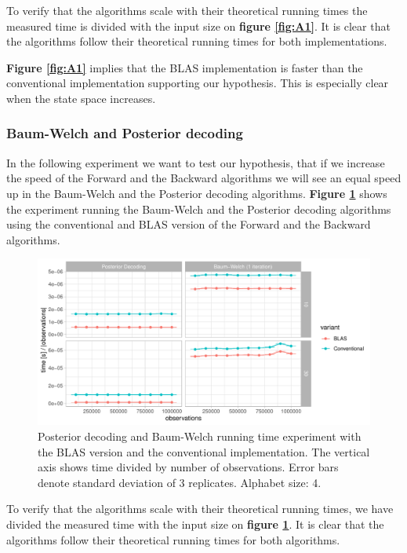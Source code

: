 To verify that the algorithms scale with their theoretical running times the measured time is divided with the input size on \textbf{figure \ref{fig:A1}}. It is clear that the algorithms follow their theoretical running times for both implementations.

\textbf{Figure \ref{fig:A1}} implies that the BLAS implementation is faster than the conventional implementation supporting our hypothesis. This is especially clear when the state space increases.

\subsubsection{Baum-Welch and Posterior decoding}\label{sec:A2}

In the following experiment we want to test our hypothesis, that if we increase the speed of the Forward and the Backward algorithms we will see an equal speed up in the Baum-Welch and the Posterior decoding algorithms. \textbf{Figure \ref{fig:A2}} shows the experiment running the Baum-Welch and the Posterior decoding algorithms using the conventional and BLAS version of the Forward and the Backward algorithms.

\begin{figure}[H]
  \centering
  \includegraphics[scale=0.85]{figures/figure_A2.pdf}
  \caption{\small{Posterior decoding and Baum-Welch running time experiment with the BLAS version and the conventional implementation. The vertical axis shows time divided by number of observations. Error bars denote standard deviation of 3 replicates. Alphabet size: 4.}}
  \label{fig:A2}
\end{figure}

To verify that the algorithms scale with their theoretical running times, we have divided the measured time with the input size on \textbf{figure \ref{fig:A2}}. It is clear that the algorithms follow their theoretical running times for both algorithms.

